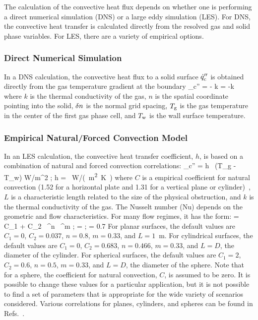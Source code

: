 The calculation of the convective heat flux depends on whether one is performing a direct numerical simulation (DNS) or a large eddy simulation (LES). For DNS, the convective heat transfer is calculated directly from the resolved gas and solid phase variables. For LES, there are a variety of empirical options.

\subsubsection{Direct Numerical Simulation}

In a DNS calculation, the convective heat flux to a solid surface $\dot{q}''_{\rm c}$ is obtained directly from the gas temperature gradient at the boundary
\be
   \dq_{\rm c}'' = - k \;  = -k 
\ee
where $k$ is the thermal conductivity of the gas, $n$ is the spatial coordinate pointing into the solid, $\delta n$ is the normal grid spacing, $T_{\rm g}$ is the gas temperature in the center of the first gas phase cell, and $T_{\rm w}$ is the wall surface temperature.

\subsubsection{Empirical Natural/Forced Convection Model}

In an LES calculation, the convective heat transfer coefficient, $h$, is based on a combination of natural and forced convection correlations:
\be \dq_{\rm c}'' = h \, (T_{\rm g} - T_{\rm w}) \quad \hbox{W/m}^2 \quad ; \quad
    h = \max \,   \quad  \si{W/(m^2.K)}
    \label{eq:qconv}
\ee
where $C$ is a empirical coefficient for natural convection (1.52 for a horizontal plate and 1.31 for a vertical plane or cylinder)~\cite{Holman:1}, $L$ is a characteristic length related to the size of the physical obstruction, and $k$ is the thermal conductivity of the gas. The Nusselt number (Nu) depends on the geometric and flow characteristics. For many flow regimes, it has the form:
\be
   \NU = C_1 + C_2 \, \RE^n \, \PR^m  \quad ; \quad \RE =  \quad ; \quad \PR = 0.7
\ee
For planar surfaces, the default values are $C_1=0$, $C_2=0.037$, $n=0.8$, $m=0.33$, and $L=1$~m. For cylindrical surfaces, the default values are $C_1=0$, $C_2=0.683$, $n=0.466$, $m=0.33$, and $L=D$, the diameter of the cylinder. For spherical surfaces, the default values are $C_1=2$, $C_2=0.6$, $n=0.5$, $m=0.33$, and $L=D$, the diameter of the sphere. Note that for a sphere, the coefficient for natural convection, $C$, is assumed to be zero. It is possible to change these values for a particular application, but it is not possible to find a set of parameters that is appropriate for the wide variety of scenarios considered. Various correlations for planes, cylinders, and spheres can be found in Refs.~\cite{Holman:1,Incropera:1}.


